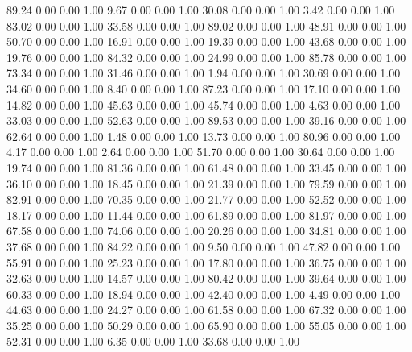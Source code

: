    89.24   0.00   0.00   1.00
    9.67   0.00   0.00   1.00
   30.08   0.00   0.00   1.00
    3.42   0.00   0.00   1.00
   83.02   0.00   0.00   1.00
   33.58   0.00   0.00   1.00
   89.02   0.00   0.00   1.00
   48.91   0.00   0.00   1.00
   50.70   0.00   0.00   1.00
   16.91   0.00   0.00   1.00
   19.39   0.00   0.00   1.00
   43.68   0.00   0.00   1.00
   19.76   0.00   0.00   1.00
   84.32   0.00   0.00   1.00
   24.99   0.00   0.00   1.00
   85.78   0.00   0.00   1.00
   73.34   0.00   0.00   1.00
   31.46   0.00   0.00   1.00
    1.94   0.00   0.00   1.00
   30.69   0.00   0.00   1.00
   34.60   0.00   0.00   1.00
    8.40   0.00   0.00   1.00
   87.23   0.00   0.00   1.00
   17.10   0.00   0.00   1.00
   14.82   0.00   0.00   1.00
   45.63   0.00   0.00   1.00
   45.74   0.00   0.00   1.00
    4.63   0.00   0.00   1.00
   33.03   0.00   0.00   1.00
   52.63   0.00   0.00   1.00
   89.53   0.00   0.00   1.00
   39.16   0.00   0.00   1.00
   62.64   0.00   0.00   1.00
    1.48   0.00   0.00   1.00
   13.73   0.00   0.00   1.00
   80.96   0.00   0.00   1.00
    4.17   0.00   0.00   1.00
    2.64   0.00   0.00   1.00
   51.70   0.00   0.00   1.00
   30.64   0.00   0.00   1.00
   19.74   0.00   0.00   1.00
   81.36   0.00   0.00   1.00
   61.48   0.00   0.00   1.00
   33.45   0.00   0.00   1.00
   36.10   0.00   0.00   1.00
   18.45   0.00   0.00   1.00
   21.39   0.00   0.00   1.00
   79.59   0.00   0.00   1.00
   82.91   0.00   0.00   1.00
   70.35   0.00   0.00   1.00
   21.77   0.00   0.00   1.00
   52.52   0.00   0.00   1.00
   18.17   0.00   0.00   1.00
   11.44   0.00   0.00   1.00
   61.89   0.00   0.00   1.00
   81.97   0.00   0.00   1.00
   67.58   0.00   0.00   1.00
   74.06   0.00   0.00   1.00
   20.26   0.00   0.00   1.00
   34.81   0.00   0.00   1.00
   37.68   0.00   0.00   1.00
   84.22   0.00   0.00   1.00
    9.50   0.00   0.00   1.00
   47.82   0.00   0.00   1.00
   55.91   0.00   0.00   1.00
   25.23   0.00   0.00   1.00
   17.80   0.00   0.00   1.00
   36.75   0.00   0.00   1.00
   32.63   0.00   0.00   1.00
   14.57   0.00   0.00   1.00
   80.42   0.00   0.00   1.00
   39.64   0.00   0.00   1.00
   60.33   0.00   0.00   1.00
   18.94   0.00   0.00   1.00
   42.40   0.00   0.00   1.00
    4.49   0.00   0.00   1.00
   44.63   0.00   0.00   1.00
   24.27   0.00   0.00   1.00
   61.58   0.00   0.00   1.00
   67.32   0.00   0.00   1.00
   35.25   0.00   0.00   1.00
   50.29   0.00   0.00   1.00
   65.90   0.00   0.00   1.00
   55.05   0.00   0.00   1.00
   52.31   0.00   0.00   1.00
    6.35   0.00   0.00   1.00
   33.68   0.00   0.00   1.00
